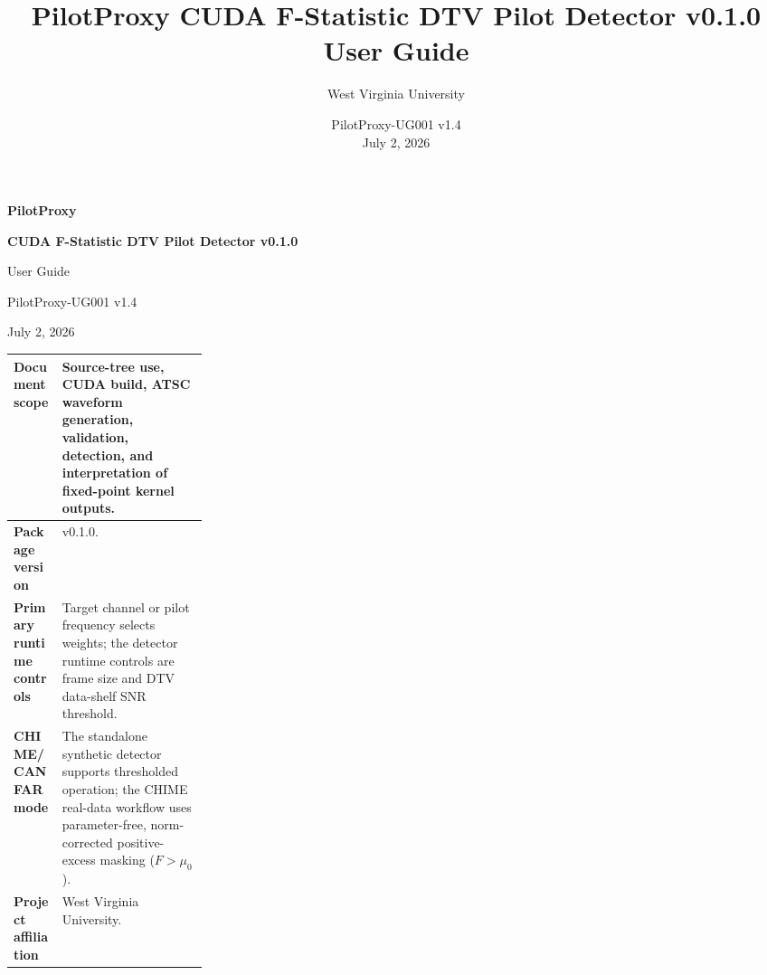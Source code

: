 \documentclass[10pt,letterpaper]{article}
\title{PilotProxy CUDA F-Statistic DTV Pilot Detector v0.1.0\\User Guide}
\author{West Virginia University}
\date{PilotProxy-UG001 v1.4 \\ July 2, 2026}
\newcommand{\code}[1]{\texttt{\detokenize{#1}}}
\begin{document}
\thispagestyle{empty}
\vspace*{0.25in}
{\fontsize{30}{32}\selectfont\bfseries\color{FStatRed}PilotProxy}\par
\vspace{0.12in}
{\fontsize{23}{26}\selectfont\bfseries CUDA F-Statistic DTV Pilot Detector v0.1.0}\par
\vspace{0.08in}
{\Large User Guide}\par
\vspace{0.35in}
{\large PilotProxy-UG001 v1.4}\par
{\large July 2, 2026}\par
\vfill
\begin{tabularx}{\linewidth}{|>{\bfseries}L{0.25\linewidth}|Y|}
\hline
Document scope & Source-tree use, CUDA build, ATSC waveform generation, validation, detection, and interpretation of fixed-point kernel outputs.\\ \hline
Package version & \code{pilot-proxy} v0.1.0.\\ \hline
Primary runtime controls & Target channel or pilot frequency selects weights; the detector runtime controls are frame size and DTV data-shelf SNR threshold.\\ \hline
CHIME/CANFAR mode & The standalone synthetic detector supports thresholded operation; the CHIME real-data workflow uses parameter-free, norm-corrected positive-excess masking ($F>\mu_0$).\\ \hline
Project affiliation & West Virginia University.\\ \hline
\end{tabularx}
\newpage
\end{document}
